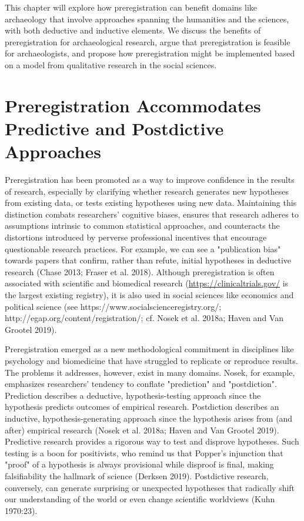 \documentclass[article]{sa}
\begin{document}
This chapter will explore how preregistration can benefit domains like
archaeology that involve approaches spanning the humanities and the
sciences, with both deductive and inductive elements. We discuss the
benefits of preregistration for archaeological research, argue that
preregistration is feasible for archaeologists, and propose how
preregistration might be implemented based on a model from qualitative
research in the social sciences.

\section{Preregistration Accommodates
Predictive and Postdictive Approaches}

Preregistration has been promoted as a way to improve confidence in the
results of research, especially by clarifying whether research generates
new hypotheses from existing data, or tests existing hypotheses using
new data. Maintaining this distinction combats researchers' cognitive
biases, ensures that research adheres to assumptions intrinsic to common
statistical approaches, and counteracts the distortions introduced by
perverse professional incentives that encourage questionable research
practices. For example, we can see a "publication bias" towards papers
that confirm, rather than refute, initial hypotheses in deductive
research (Chase 2013; Fraser et al. 2018). Although preregistration is
often associated with scientific and biomedical research
(\url{https://clinicaltrials.gov/} is the largest existing registry), it
is also used in social sciences like economics and political science
(see https://www.socialscienceregistry.org/;
http://egap.org/content/registration/; cf. Nosek et al. 2018a; Haven and
Van Grootel 2019).

Preregistration emerged as a new methodological commitment in
disciplines like psychology and biomedicine that have struggled to
replicate or reproduce results. The problems it addresses, however,
exist in many domains. Nosek, for example, emphasizes researchers'
tendency to conflate "prediction" and "postdiction". Prediction
describes a deductive, hypothesis-testing approach since the hypothesis
predicts outcomes of empirical research. Postdiction describes an
inductive, hypothesis-generating approach since the hypothesis arises
from (and after) empirical research (Nosek et al. 2018a; Haven and Van
Grootel 2019). Predictive research provides a rigorous way to test and
disprove hypotheses. Such testing is a boon for positivists, who remind
us that Popper's injunction that "proof" of a hypothesis is always
provisional while disproof is final, making falsifiability the hallmark
of science (Derksen 2019). Postdictive research, conversely, can
generate surprising or unexpected hypotheses that radically shift our
understanding of the world or even change scientific worldviews (Kuhn
1970:23).
\end{document}

